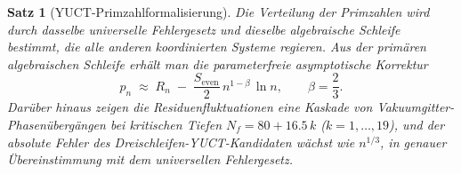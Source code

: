 \documentclass[12pt,a4paper]{article}
\newtheorem{theorem}{Satz}[section]
\theoremstyle{remark}
\begin{document}
	\begin{theorem}[YUCT-Primzahlformalisierung]\label{thm:prime}
		Die Verteilung der Primzahlen wird durch dasselbe universelle Fehlergesetz
		und dieselbe algebraische Schleife bestimmt, die alle anderen koordinierten
		Systeme regieren. Aus der primären algebraischen Schleife erhält man die
		parameterfreie asymptotische Korrektur
		\begin{equation}\label{eq:yuct-prime-theorem}
			\boxed{ p_n \;\approx\; R_n \;-\; \frac{S_{\mathrm{even}}}{2}\,
				n^{1-\beta}\,\ln n },
			\qquad \beta = \frac{2}{3}.
		\end{equation}
		Darüber hinaus zeigen die Residuenfluktuationen eine Kaskade von
		Vakuumgitter-Phasenübergängen bei kritischen Tiefen
		\(N_f = 80 + 16.5\,k\) (\(k=1,\dots,19\)), und der absolute Fehler des
		Dreischleifen-YUCT-Kandidaten wächst wie \(n^{1/3}\), in genauer
		Übereinstimmung mit dem universellen Fehlergesetz.
	\end{theorem}
	
\end{document}
